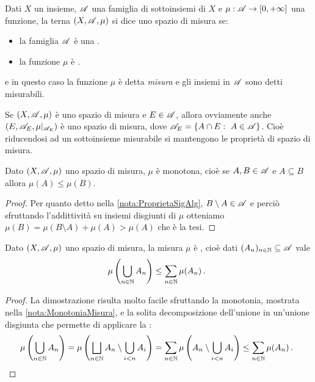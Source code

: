 \begin{definition}
	Dati $X$ un insieme, $\mathscr A$ una famiglia di sottoinsiemi di $X$ e $\mu:\mathscr A\to [0,+\infty]$ una funzione, la terna $(X,\mathscr A, \mu)$ si dice uno spazio di misura se:
	\begin{itemize}
		\item la famiglia $\mathscr A$ è una \sigalg{}.
		\item la funzione $\mu$ è \sigadd{}.
	\end{itemize}
	e in questo caso la funzione $\mu$ è detta \emph{misura} e gli insiemi in $\mathscr A$ sono detti misurabili.
\end{definition}

\begin{remark}\label{nota:RiduzioneMisura}
	Se $(X,\mathscr A,\mu)$ è uno spazio di misura e $E\in\mathscr A$, allora ovviamente anche $(E,\mathscr A_E,\mu|_{\mathscr A_E})$ è uno spazio di misura, dove $\A_E=\{A\cap E:\ A\in\A\}$. Cioè riducendosi ad un sottoinsieme misurabile si mantengono le proprietà di spazio di misura.
\end{remark}

\begin{remark}\label{nota:MonotoniaMisura}
	Dato $(X,\mathscr A,\mu)$ uno spazio di misura, $\mu$ è monotona, cioè se $A,B\in\mathscr A$ e $A\subseteq B$ allora $\mu(A)\le \mu(B)$.
\end{remark}
\begin{proof}
	Per quanto detto nella \cref{nota:ProprietaSigAlg}, $B\setminus A\in\mathscr A$ e perciò sfruttando l'addittività su insiemi disgiunti di $\mu$ otteniamo $\mu(B)=\mu(B\setminus A)+\mu(A)>\mu(A)$ che è la tesi.
\end{proof}
\begin{remark}\label{nota:SubAdditivitaMisura}
	Dato $(X,\mathscr A,\mu)$ uno spazio di misura, la misura $\mu$ è \sigsubadd{}, cioè dati $(A_n)_{n\in\mathbb N}\subseteq\mathscr A$ vale
	\begin{equation*}
		\mu\left(\bigcup_{n\in\mathbb N} A_n \right)\le \sum_{n\in\mathbb N}\mu(A_n) \, \text{. }
	\end{equation*}
\end{remark}
\begin{proof}
	La dimostrazione risulta molto facile sfruttando la monotonia, mostrata nella \cref{nota:MonotoniaMisura}, e la solita decomposizione dell'unione in un'unione disgiunta che permette di applicare la \sigadd[ità]:
	\begin{equation*}
		\mu\left(\bigcup_{n\in\mathbb N} A_n \right)=\mu\left(\bigsqcup_{n\in\mathbb N} A_n\setminus\bigcup_{i<n}A_i \right)=
		\sum_{n\in\mathbb N}\mu\left(A_n\setminus\bigcup_{i<n}A_i\right)\le \sum_{n\in\mathbb N}\mu(A_n) \, \text{. }
	\end{equation*}
\end{proof}



